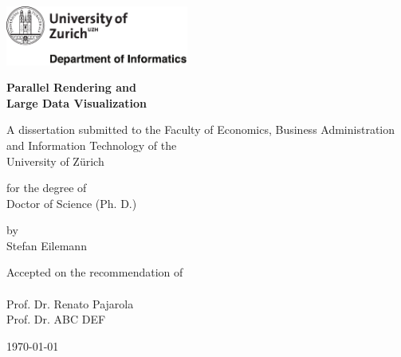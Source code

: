 

\begin{titlepage}

\setlength{\parindent}{0pt} %

\includegraphics[width=6cm]{front/images/uzhlogo.pdf}

\vspace{-2.25cm}

\begingroup
{}

\vspace{-0.75cm}
\Large
\textbf{Parallel Rendering and\\Large Data Visualization}

\vspace{0.70cm}

\normalsize
A dissertation submitted to the Faculty of Economics,
Business Administration and Information Technology of the\\ University of Z\"urich\\

\vspace{0.70cm}

for the degree of\\
Doctor of Science (Ph. D.)

\vspace{0.70cm}

by\\
Stefan Eilemann

\vspace{3.7cm}

Accepted on the recommendation of \\
\\
Prof. Dr. Renato Pajarola\\
Prof. Dr. ABC DEF

\vspace{2.2cm}
\today

\vspace{2.2cm}

\endgroup

\end{titlepage}
